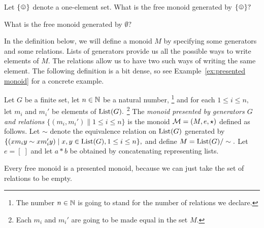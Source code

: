 \documentclass[CT4S-EN-RU]{subfiles}
\begin{document}
\begin{definitionRUS}\label{def:free monoid}
\end{definitionRUS}

\begin{exerciseENG}
Let $\singleton$ denote a one-element set.
\sexc What is the free monoid generated by $\singleton?$
\item What is the free monoid generated by $\emptyset?$
\endsexc
\end{exerciseENG}

\begin{exerciseRUS}
\end{exerciseRUS}

\begin{blockENG}
In the definition below, we will define a monoid $M$  by specifying some generators and some relations. Lists of generators provide us all the possible ways to write elements of $M.$ The relations allow us to have two such ways of writing the same element. The following definition is a bit dense, so see Example~\ref{ex:presented monoid} for a concrete example.
\end{blockENG}

\begin{blockRUS}
\end{blockRUS}

\begin{definitionENG}\label{def:presented monoid}
Let $G$ be a finite set, let $n\in{\mathbb N}$ be a natural number,
\footnote{The number $n\in{\mathbb N}$ is going to stand for the number of relations we declare.}
and for each $1\leq i\leq n,$ let $m_i$ and $m_i'$ be elements of $\textnormal{List}(G).$
\footnote{Each $m_i$ and $m_i'$ are going to be made equal in the set $M.$}
The {\em monoid presented by generators $G$ and relations $\{(m_i,m_i')\|1\leq i\leq n\}$} is the monoid $\mathcal{M}=(M,e,\star)$ defined as follows. Let $\sim$ denote the equivalence relation on $\textnormal{List}(G)$ generated by $\{(xm_iy\sim xm_i'y){\;|\;}x,y\in\textnormal{List}(G), 1\leq i\leq n\},$ and define $M=\textnormal{List}(G)/\sim.$ Let $e=[\;]$ and let $a * b$ be obtained by concatenating representing lists.
\end{definitionENG}

\begin{definitionRUS}\label{def:presented monoid}
\end{definitionRUS}

\begin{remarkENG}
Every free monoid is a presented monoid, because we can just take the set of relations to be empty.
\end{remarkENG}
\end{document}
